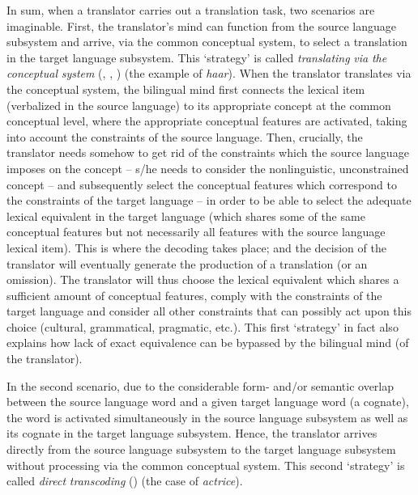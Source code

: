 In sum, when a translator carries out a translation task, two scenarios are imaginable. First, the translator’s mind can function from the source language subsystem and arrive, via the common conceptual system, to select a translation in the target language subsystem. This ‘strategy’ is called \textit{translating} \textit{via} \textit{the} \textit{conceptual} \textit{system} (\citealt[54-55]{house_towards_2013}, \citeyear{house_translation_2015}, \citeyear[119-20]{house_translation_2016}) (the example of \textit{haar}). When the translator translates via the conceptual system, the bilingual mind first connects the lexical item (verbalized in the source language) to its appropriate concept at the common conceptual level, where the appropriate conceptual features are activated, taking into account the constraints of the source language. Then, crucially, the translator needs somehow to get rid of the constraints which the source language imposes on the concept – s/he needs to consider the nonlinguistic, unconstrained concept – and subsequently select the conceptual features which correspond to the constraints of the target language – in order to be able to select the adequate lexical equivalent in the target language (which shares some of the same conceptual features but not necessarily all features with the source language lexical item). This is where the decoding takes place; and the decision of the translator will eventually generate the production of a translation (or an omission). The translator will thus choose the lexical equivalent which shares a sufficient amount of conceptual features, comply with the constraints of the target language and consider all other constraints that can possibly act upon this choice (cultural, grammatical, pragmatic, etc.). This first ‘strategy’ in fact also explains how lack of exact equivalence can be bypassed by the bilingual mind (of the translator).

In the second scenario, due to the considerable form- and/or semantic overlap between the source language word and a given target language word (a cognate), the word is activated simultaneously in the source language subsystem as well as its cognate in the target language subsystem. Hence, the translator arrives directly from the source language subsystem to the target language subsystem without processing via the common conceptual system. This second ‘strategy’ is called \textit{direct} \textit{transcoding} (\citealt[54-55|{house_towards_2013}, \citeyear{house_translation_2015}, \citeyear[119-120]{house_translation_2016}) (the case of \textit{actrice}).

